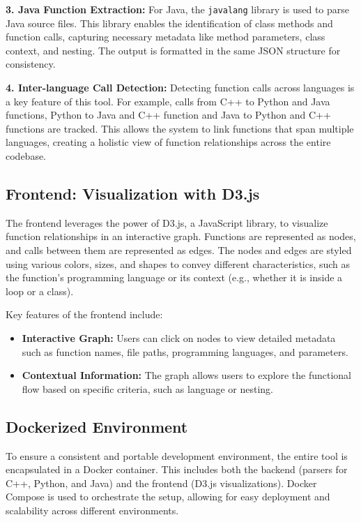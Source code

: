 \documentclass[10pt,twocolumn]{article}
\begin{document}
\textbf{3. Java Function Extraction:}  
For Java, the \texttt{javalang} library is used to parse Java source files. This library enables the identification of class methods and function calls, capturing necessary metadata like method parameters, class context, and nesting. The output is formatted in the same JSON structure for consistency.

\textbf{4. Inter-language Call Detection:}  
Detecting function calls across languages is a key feature of this tool. For example, calls from C++ to Python and Java functions, Python to Java and C++ function and Java to Python and C++ functions are tracked. This allows the system to link functions that span multiple languages, creating a holistic view of function relationships across the entire codebase.

\subsection{Frontend: Visualization with D3.js}

The frontend leverages the power of D3.js, a JavaScript library, to visualize function relationships in an interactive graph. Functions are represented as nodes, and calls between them are represented as edges. The nodes and edges are styled using various colors, sizes, and shapes to convey different characteristics, such as the function's programming language or its context (e.g., whether it is inside a loop or a class).

Key features of the frontend include:
\begin{itemize}
    \item \textbf{Interactive Graph:} Users can click on nodes to view detailed metadata such as function names, file paths, programming languages, and parameters.
    \item \textbf{Contextual Information:} The graph allows users to explore the functional flow based on specific criteria, such as language or nesting.
\end{itemize}

\subsection{Dockerized Environment}

To ensure a consistent and portable development environment, the entire tool is encapsulated in a Docker container. This includes both the backend (parsers for C++, Python, and Java) and the frontend (D3.js visualizations). Docker Compose is used to orchestrate the setup, allowing for easy deployment and scalability across different environments.
\end{document}
